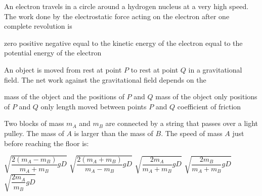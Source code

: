 \documentclass{../../oss-apphys-exam}
\begin{document}
\begin{multicols*}{2}
\begin{questions}
    \question An electron travels in a circle around a hydrogen nucleus at a
    very high speed. The work done by the electrostatic force acting on the
    electron after one complete revolution is
    \begin{choices}
      \choice zero
      \choice positive
      \choice negative
      \choice equal to the kinetic energy of the electron
      \choice equal to the potential energy of the electron
    \end{choices}
    \vspace{.7in}
    
    \question An object is moved from rest at point $P$ to rest at point $Q$ in
    a gravitational field. The net work against the gravitational field depends
    on the
    \begin{choices}
      \choice mass of the object and the positions of $P$ and $Q$
      \choice mass of the object only
      \choice positions of $P$ and $Q$ only
      \choice length moved between points $P$ and $Q$
      \choice coefficient of friction
    \end{choices}
    \vspace{.7in}

    \question Two blocks of mass $m_A$ and $m_B$ are connected by a string that
    passes over a light pulley. The mass of $A$ is larger than the mass of $B$.
    The speed of mass $A$ just before reaching the floor is:
    \begin{center}
    \end{center}
    \begin{choices}
      \choice $\sqrt{\dfrac{2(m_A-m_B)}{m_A+m_B}gD}$
      \choice $\sqrt{\dfrac{2(m_A+m_B)}{m_A-m_B}gD}$
      \choice $\sqrt{\dfrac{2m_A}{m_A+m_B}gD}$
      \choice $\sqrt{\dfrac{2m_B}{m_A+m_B}gD}$
      \choice $\sqrt{\dfrac{2m_A}{m_B}gD}$
    \end{choices}
    


\end{questions}
\end{multicols*}
\end{document}
